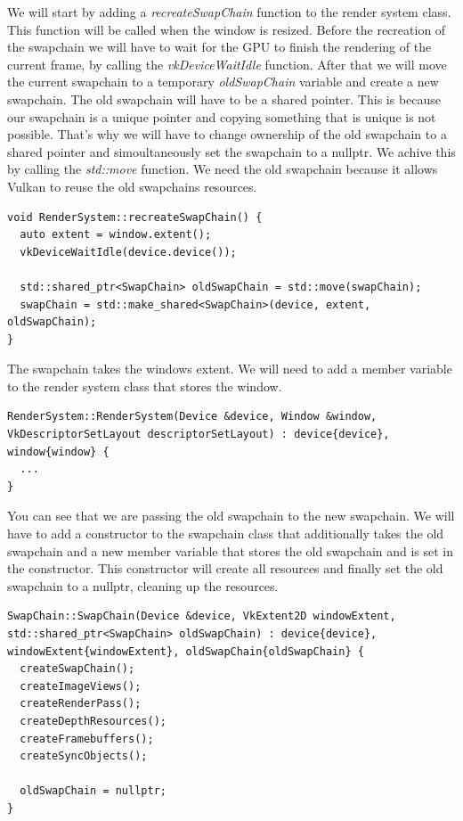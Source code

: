 \documentclass[12pt]{report} \usepackage{preamble}
\begin{document}
We will start by adding a \textit{recreateSwapChain} function to the render system class. This function will be called when the window is resized.
Before the recreation of the swapchain we will have to wait for the GPU to finish the rendering of the current frame, by calling the
\textit{vkDeviceWaitIdle} function. After that we will move the current swapchain to a temporary \textit{oldSwapChain} variable and create a new swapchain.
The old swapchain will have to be a shared pointer. This is because our swapchain is a unique pointer and copying something that is unique is not possible.
That's why we will have to change ownership of the old swapchain to a shared pointer and simoultaneously set the swapchain to a nullptr.
We achive this by calling the \textit{std::move} function. We need the old swapchain because it allows Vulkan to reuse the old swapchains resources.

\begin{lstlisting}[Language=C++]
void RenderSystem::recreateSwapChain() {
  auto extent = window.extent();
  vkDeviceWaitIdle(device.device());

  std::shared_ptr<SwapChain> oldSwapChain = std::move(swapChain);
  swapChain = std::make_shared<SwapChain>(device, extent, oldSwapChain);
}
\end{lstlisting}

The swapchain takes the windows extent. We will need to add a member variable to the render system class that stores the window.

\begin{lstlisting}[Language=C++]
RenderSystem::RenderSystem(Device &device, Window &window, VkDescriptorSetLayout descriptorSetLayout) : device{device}, window{window} {
  ...
}
\end{lstlisting}

You can see that we are passing the old swapchain to the new swapchain. We will have to add a constructor to the swapchain class that additionally takes the old swapchain
and a new member variable that stores the old swapchain and is set in the constructor. This constructor will create all resources and finally set the old swapchain to a nullptr,
cleaning up the resources.

\begin{lstlisting}[Language=C++]
SwapChain::SwapChain(Device &device, VkExtent2D windowExtent, std::shared_ptr<SwapChain> oldSwapChain) : device{device}, windowExtent{windowExtent}, oldSwapChain{oldSwapChain} {
  createSwapChain();
  createImageViews();
  createRenderPass();
  createDepthResources();
  createFramebuffers();
  createSyncObjects();

  oldSwapChain = nullptr;
}
\end{lstlisting}
\end{document}
